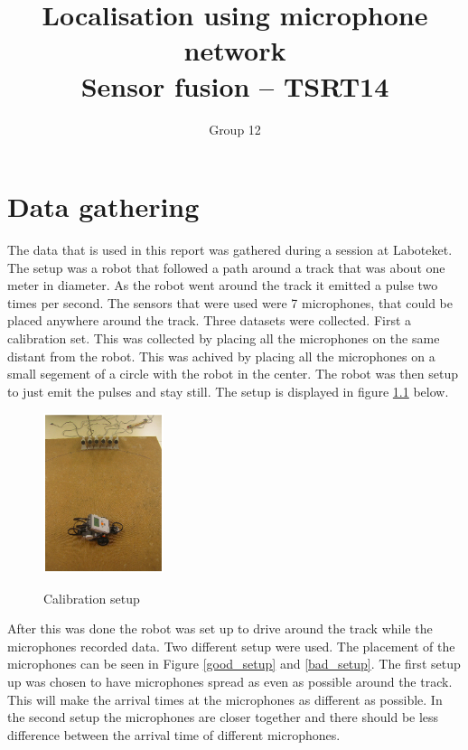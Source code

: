 \documentclass[10pt,a4paper]{report}
\begin{document}
\title{Localisation using microphone network\\Sensor fusion -- TSRT14}
\author{Group 12}
\maketitle


\tableofcontents

\newpage
\chapter{Data gathering}
\label{Data gathering}
The data that is used in this report was gathered during a session at Laboteket.
The setup was a robot that followed a path around a track that was about one meter in diameter.
As the robot went around the track it emitted a pulse two times per second.
The sensors that were used were 7 microphones, that could be placed anywhere around the track.
Three datasets were collected.
First a calibration set. This was collected by placing all the microphones on the same distant from the robot.
This was achived by placing all the microphones on a small segement of a circle with the robot in the center.
The robot was then setup to just emit the pulses and stay still. The setup is displayed in figure \ref{calibtration_setup} below.
\begin{figure}[H]
\begin{center}
  \label{calibtration_setup}
  \includegraphics[width = 100pt]{calibration_setup.png}
  \caption{Calibration setup}
  \end{center}
\end{figure}

After this was done the robot was set up to drive around the track while the microphones recorded data.
Two different setup were used. The placement of the microphones can be seen in Figure \ref{good_setup} and \ref{bad_setup}.
The first setup up was chosen to have microphones spread as even as possible around the track.
This will make the arrival times at the microphones as different as possible.
In the second setup the microphones are closer together and there should be less difference between the arrival time of different microphones.
\end{document}
